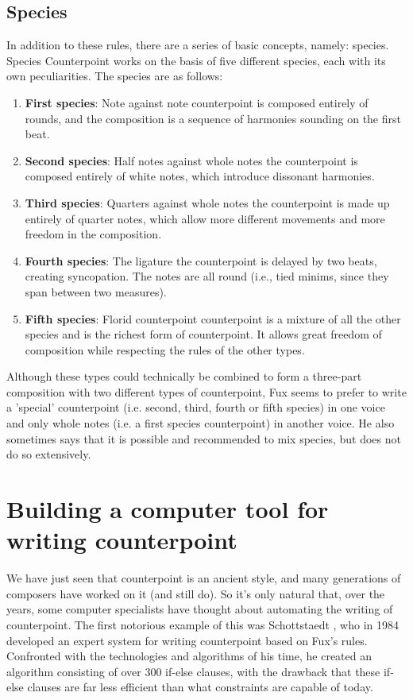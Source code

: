 \subsection{Species}
In addition to these rules, there are a series of basic concepts, namely: species. Species Counterpoint works on the basis of five different species, each with its own peculiarities. The species are as follows:
\begin{enumerate}
    \item \textbf{First species}: Note against note \textendash{} counterpoint is composed entirely of rounds, and the composition is a sequence of harmonies sounding on the first beat.
    \item \textbf{Second species}: Half notes against whole notes \textendash{} the counterpoint is composed entirely of white notes, which introduce dissonant harmonies.
    \item \textbf{Third species}: Quarters against whole notes \textendash{} the counterpoint is made up entirely of quarter notes, which allow more different movements and more freedom in the composition.
    \item \textbf{Fourth species}: The ligature \textendash{} the counterpoint is delayed by two beats, creating syncopation. The notes are all round (i.e., tied minims, since they span between two measures).
    \item \textbf{Fifth species}: Florid counterpoint \textendash{} counterpoint is a mixture of all the other species and is the richest form of counterpoint. It allows great freedom of composition while respecting the rules of the other types.
\end{enumerate}

Although these types could technically be combined to form a three-part composition with two different types of counterpoint, Fux seems to prefer to write a 'special' counterpoint (i.e. second, third, fourth or fifth species) in one voice and only whole notes (i.e. a first species counterpoint) in another voice. He also sometimes says that it is possible and recommended to mix species, but does not do so extensively.

\section{Building a computer tool for writing counterpoint}
We have just seen that counterpoint is an ancient style, and many generations of composers have worked on it (and still do). So it's only natural that, over the years, some computer specialists have thought about automating the writing of counterpoint. The first notorious example of this was Schottstaedt \cite{bill1984}, who in 1984 developed an expert system for writing counterpoint based on Fux's rules. Confronted with the technologies and algorithms of his time, he created an algorithm consisting of over 300 if-else clauses, with the drawback that these if-else clauses are far less efficient than what constraints are capable of today.

